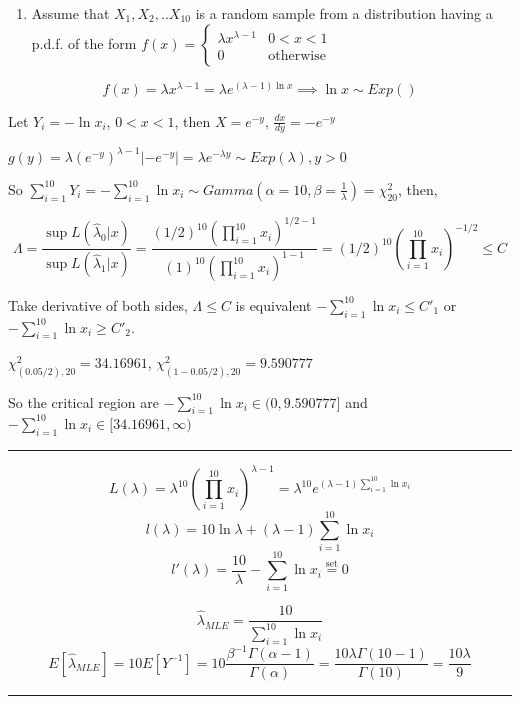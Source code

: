 \documentclass[12pt,]{article}
\title{}
\author{}
\date{}
\providecommand{\tightlist}{%
  \setlength{\itemsep}{0pt}\setlength{\parskip}{0pt}}
\begin{document}
\begin{enumerate}
\def\labelenumi{\arabic{enumi}.}
\tightlist
\item
  Assume that \(X_1,X_2,..X_{10}\) is a random sample from a
  distribution having a p.d.f. of the form
  \(f(x)=\begin{cases}\lambda x^{\lambda-1}& 0<x<1\\0&\text{otherwise}\end{cases}\)
\end{enumerate}

\[f(x)=\lambda x^{\lambda-1}=\lambda e^{(\lambda-1)\ln x}\implies\ln x\sim Exp()\]

Let \(Y_i=-\ln x_i\), \(0<x<1\), then \(X=e^{-y}\),
\(\frac{dx}{dy}=-e^{-y}\)

\(g(y)=\lambda(e^{-y})^{\lambda-1}|-e^{-y}|=\lambda e^{-\lambda y}\sim Exp(\lambda), y>0\)

So
\(\sum_{i=1}^{10}Y_i=-\sum_{i=1}^{10}\ln x_i\sim Gamma(\alpha=10,\beta=\frac1{\lambda})=\chi^2_{20}\),
then,

\[\Lambda=\frac{\sup L(\hat\lambda_0|x)}{\sup L(\hat\lambda_{1}|x)}=\frac{(1/2)^{10}(\prod_{i=1}^{10} x_i)^{1/2-1}}{(1)^{10}(\prod_{i=1}^{10} x_i)^{1-1}}=(1/2)^{10}(\prod_{i=1}^{10} x_i)^{-1/2}\le C\]

Take derivative of both sides, \(\Lambda\le C\) is equivalent
\(-\sum_{i=1}^{10}\ln x_i\le C'_1\) or
\(-\sum_{i=1}^{10}\ln x_i\ge C'_2\).

\(\chi^2_{(0.05/2),20}=34.16961\), \(\chi^2_{(1-0.05/2),20}=9.590777\)

So the critical region are \(-\sum_{i=1}^{10}\ln x_i\in(0, 9.590777]\)
and \(-\sum_{i=1}^{10}\ln x_i\in[34.16961,\infty)\)

\begin{center}\rule{0.5\linewidth}{\linethickness}\end{center}

\[L(\lambda)=\lambda^{10}(\prod_{i=1}^{10} x_i)^{\lambda-1}=\lambda^{10}e^{(\lambda-1)\sum^{10}_{i=1} \ln x_i}\]
\[l(\lambda)=10\ln\lambda+(\lambda-1)\sum^{10}_{i=1} \ln x_i\]
\[l'(\lambda)=\frac{10}\lambda-\sum^{10}_{i=1} \ln x_i\overset{\text{set}}{=}0\]

\[\hat\lambda_{MLE}=\frac{10}{\sum_{i=1}^{10}\ln x_i}\]
\[E[\hat\lambda_{MLE}]=10E[Y^{-1}]=10\frac{\beta^{-1}\Gamma(\alpha-1)}{\Gamma(\alpha)}=\frac{10\lambda\Gamma(10-1)}{\Gamma(10)}=\frac{10\lambda}{9}\]

\begin{center}\rule{0.5\linewidth}{\linethickness}\end{center}
\end{document}
